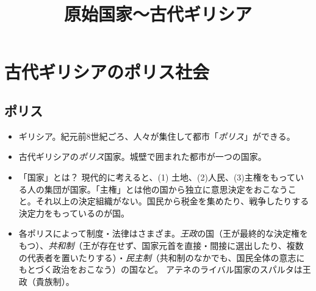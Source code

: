 \documentclass[uplatex,dvipdfmx]{jsarticle} \usepackage{mystyle}%
\title{原始国家〜古代ギリシア}
\begin{document}
\maketitle




\section{古代ギリシアのポリス社会}

\subsection{ポリス}

\begin{itemize}
\item ギリシア。紀元前8世紀ごろ、人々が集住して都市「\emph{ポリス}」ができる。
\item 古代ギリシアの\emph{ポリス}国家。城壁で囲まれた都市が一つの国家。
\item 「国家」とは？ 現代的に考えると、(1) 土地、(2)人民、(3)主権をもっている人の集団が国家。「主権」とは他の国から独立に意思決定をおこなうこと。それ以上の決定組織がない。国民から税金を集めたり、戦争したりする決定力をもっているのが国。
\item 各ポリスによって制度・法律はさまざま。\emph{王政}の国（王が最終的な決定権をもつ）、\emph{共和制}（王が存在せず、国家元首を直接・間接に選出したり、複数の代表者を置いたりする）・\emph{民主制}（共和制のなかでも、国民全体の意志にもとづく政治をおこなう）の国など。
アテネのライバル国家のスパルタは王政（貴族制）。

\end{itemize}
\end{document}
